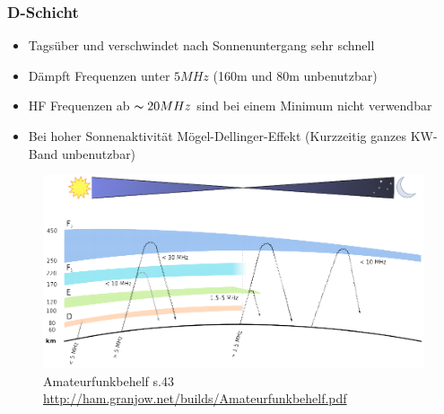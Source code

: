 \begin{frame}
    \frametitle{D-Schicht}
    \begin{itemize}
    			\item Tagsüber und verschwindet nach Sonnenuntergang sehr schnell
			\item Dämpft Frequenzen unter $5MHz$ (160m und 80m unbenutzbar)
                        \item HF Frequenzen ab $\thicksim20MHz$ sind bei einem Minimum nicht verwendbar
       		 	\item Bei hoher Sonnenaktivität Mögel-Dellinger-Effekt (Kurzzeitig ganzes KW-Band unbenutzbar)
    \end{itemize}
    \begin{center}
       \begin{figure}
      \includegraphics[width=.6\textwidth,height=.4\textheight,keepaspectratio]{e09/schichten_behelf_43.png}
      \caption{Amateurfunkbehelf s.43 \ExternalLink \url{http://ham.granjow.net/builds/Amateurfunkbehelf.pdf}}
    \end{figure}
    \end{center}
\end{frame}

